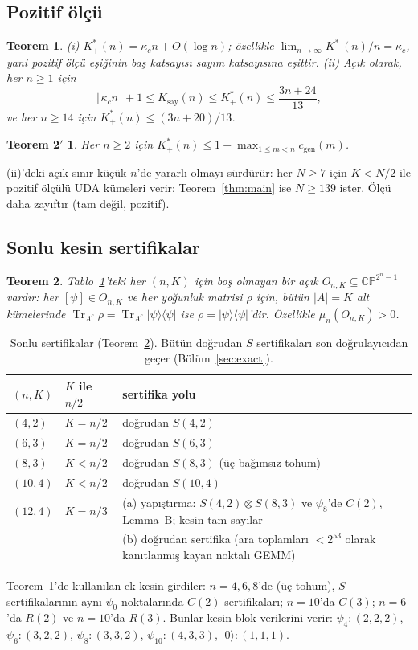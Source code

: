 \documentclass[aps,pra,onecolumn,superscriptaddress,nofootinbib,longbibliography,10pt]{revtex4-2}
\newtheorem{theorem}{Teorem}
\newtheorem*{theorem2p}{Teorem 2$'$}
\theoremstyle{definition}
\newcommand{\CP}{\mathbb{CP}}
\newcommand{\Tr}{\operatorname{Tr}}
\newcommand{\kc}{\kappa_c}
\newcommand{\Kp}{K^{*}_{+}}
\newcommand{\Kc}{K_{\mathrm{say}}}
\newcommand{\cgen}{c_{\mathrm{gen}}}
\begin{document}
\subsection{Pozitif ölçü}
\begin{theorem}\label{thm:pos}
(i) $\Kp(n)=\kc n+O(\log n)$; özellikle $\lim_{n\to\infty}\Kp(n)/n=\kc$, yani pozitif ölçü eşiğinin baş katsayısı sayım katsayısına eşittir.
(ii) Açık olarak, her $n\ge1$ için
\[
\lfloor\kc n\rfloor+1\le\Kc(n)\le\Kp(n)\le\frac{3n+24}{13},
\]
ve her $n\ge14$ için $\Kp(n)\le(3n+20)/13$.
\end{theorem}

\begin{theorem2p}
Her $n\ge2$ için $\Kp(n)\le1+\max_{1\le m<n}\cgen(m)$.
\end{theorem2p}

\noindent (ii)'deki açık sınır küçük $n$'de yararlı olmayı sürdürür: her $N\ge7$ için $K<N/2$ ile pozitif ölçülü UDA kümeleri verir; Teorem~\ref{thm:main} ise $N\ge139$ ister. Ölçü daha zayıftır (tam değil, pozitif).

\subsection{Sonlu kesin sertifikalar}
\begin{theorem}\label{thm:cert}
Tablo~\ref{tab:cert}'teki her $(n, K)$ için boş olmayan bir açık $O_{n,K}\subseteq\CP^{2^n-1}$ vardır: her $[\psi]\in O_{n,K}$ ve her yoğunluk matrisi $\rho$ için, bütün $|A|=K$ alt kümelerinde $\Tr_{A^c}\rho=\Tr_{A^c}|\psi\rangle\langle\psi|$ ise $\rho=|\psi\rangle\langle\psi|$'dir. Özellikle $\mu_n(O_{n,K})>0$.
\end{theorem}
\begin{table}[h]
\caption{Sonlu sertifikalar (Teorem~\ref{thm:cert}). Bütün doğrudan $S$ sertifikaları son doğrulayıcıdan geçer (Bölüm~\ref{sec:exact}).}\label{tab:cert}
\begin{tabular}{lll}
\toprule
$(n, K)$ & $K$ ile $n/2$ & sertifika yolu\\
\midrule
$(4, 2)$ & $K=n/2$ & doğrudan $S(4{,}2)$\\
$(6, 3)$ & $K=n/2$ & doğrudan $S(6{,}3)$\\
$(8, 3)$ & $K<n/2$ & doğrudan $S(8{,}3)$ (üç bağımsız tohum)\\
$(10, 4)$ & $K<n/2$ & doğrudan $S(10{,}4)$\\
$(12, 4)$ & $K=n/3$ & (a) yapıştırma: $S(4{,}2)\otimes S(8{,}3)$ ve $\psi_8$'de $C(2)$, Lemma~B; kesin tam sayılar\\
 & & (b) doğrudan sertifika (ara toplamları $<2^{53}$ olarak kanıtlanmış kayan noktalı GEMM)\\
\bottomrule
\end{tabular}
\end{table}
\noindent Teorem~\ref{thm:pos}'de kullanılan ek kesin girdiler: $n=4{,}6{,}8$'de (üç tohum), $S$ sertifikalarının aynı $\psi_0$ noktalarında $C(2)$ sertifikaları; $n=10$'da $C(3)$; $n=6$'da $R(2)$ ve $n=10$'da $R(3)$. Bunlar kesin blok verilerini verir: $\psi_4:(2{,}2{,}2)$, $\psi_6:(3{,}2{,}2)$, $\psi_8:(3{,}3{,}2)$, $\psi_{10}:(4{,}3{,}3)$, $|0\rangle:(1{,}1{,}1)$.
\end{document}
